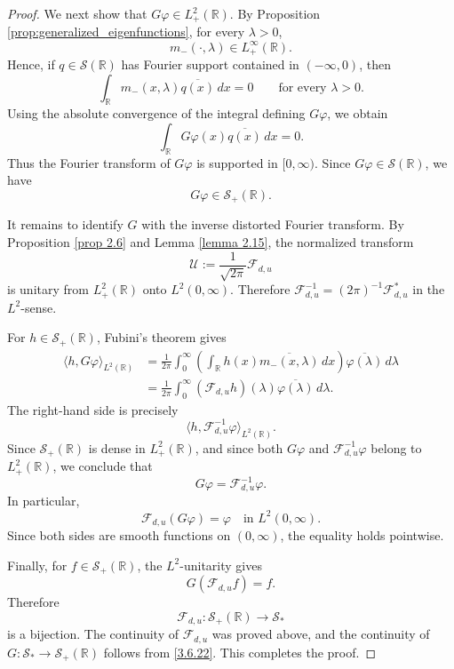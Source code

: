 \documentclass[10pt]{article}
\numberwithin{equation}{section}
\numberwithin{theorem}{section}
\begin{document}
\begin{proof}
We next show that \(G\varphi\in L^2_+(\mathbb R)\). By Proposition
\ref{prop:generalized_eigenfunctions}, for every \(\lambda>0\),
\[
m_-(\cdot,\lambda)\in L^\infty_+(\mathbb R).
\]
Hence, if \(q\in\mathcal S(\mathbb R)\) has Fourier support contained in
\((-\infty,0)\), then
\[
\int_{\mathbb R}m_-(x,\lambda)\overline{q(x)}\,dx=0
\qquad\text{for every }\lambda>0.
\]
Using the absolute convergence of the integral defining \(G\varphi\), we obtain
\[
\int_{\mathbb R}G\varphi(x)\overline{q(x)}\,dx=0.
\]
Thus the Fourier transform of \(G\varphi\) is supported in \([0,\infty)\). Since
\(G\varphi\in\mathcal S(\mathbb R)\), we have
\begin{equation}
\label{3.6.23}
G\varphi\in\mathcal S_+(\mathbb R).
\end{equation}

It remains to identify \(G\) with the inverse distorted Fourier transform. By Proposition
\ref{prop 2.6} and Lemma \ref{lemma 2.15}, the normalized transform
\[
\mathcal U:=\frac1{\sqrt{2\pi}}\mathcal F_{d,u}
\]
is unitary from \(L^2_+(\mathbb R)\) onto \(L^2(0,\infty)\). Therefore
\(\mathcal F_{d,u}^{-1}=(2\pi)^{-1}\mathcal F_{d,u}^*\) in the \(L^2\)-sense.

For \(h\in\mathcal S_+(\mathbb R)\), Fubini's theorem gives
\begin{equation}
\label{3.6.24}
\begin{aligned}
\langle h,G\varphi\rangle_{L^2(\mathbb R)}
&=
\frac1{2\pi}
\int_0^\infty
\left(
\int_{\mathbb R}h(x)\overline{m_-(x,\lambda)}\,dx
\right)
\overline{\varphi(\lambda)}\,d\lambda \\
&=
\frac1{2\pi}
\int_0^\infty
(\mathcal F_{d,u}h)(\lambda)\overline{\varphi(\lambda)}\,d\lambda .
\end{aligned}
\end{equation}
The right-hand side is precisely
\[
\langle h,\mathcal F_{d,u}^{-1}\varphi\rangle_{L^2(\mathbb R)}.
\]
Since \(\mathcal S_+(\mathbb R)\) is dense in \(L^2_+(\mathbb R)\), and since both
\(G\varphi\) and \(\mathcal F_{d,u}^{-1}\varphi\) belong to \(L^2_+(\mathbb R)\), we conclude
that
\begin{equation}
\label{3.6.25}
G\varphi=\mathcal F_{d,u}^{-1}\varphi.
\end{equation}
In particular,
\[
\mathcal F_{d,u}(G\varphi)=\varphi
\quad\text{in }L^2(0,\infty).
\]
Since both sides are smooth functions on \((0,\infty)\), the equality holds pointwise.

Finally, for \(f\in\mathcal S_+(\mathbb R)\), the \(L^2\)-unitarity gives
\[
G(\mathcal F_{d,u}f)=f.
\]
Therefore
\[
\mathcal F_{d,u}:\mathcal S_+(\mathbb R)\to\mathcal S_*
\]
is a bijection. The continuity of \(\mathcal F_{d,u}\) was proved above, and the continuity of
\(G:\mathcal S_*\to\mathcal S_+(\mathbb R)\) follows from \eqref{3.6.22}. This completes
the proof.
\end{proof}
\end{document}
